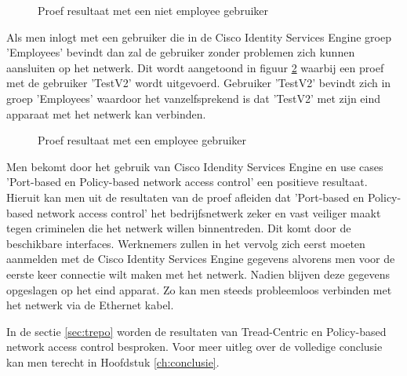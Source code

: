 \begin{figure}[H]
	\centering
	\qquad
	\newline
	\caption{Proef resultaat met een niet employee gebruiker}%
	\label{fig:Test_gebruiker}%
\end{figure}

Als men inlogt met een gebruiker die in de Cisco Identity Services Engine groep 'Employees' bevindt dan zal de gebruiker zonder problemen zich kunnen aansluiten op het netwerk. Dit wordt aangetoond in figuur \ref{fig:Test_gebruiker} waarbij een proef met de gebruiker 'TestV2' wordt uitgevoerd. Gebruiker 'TestV2' bevindt zich in groep 'Employees' waardoor het vanzelfsprekend is dat 'TestV2' met zijn eind apparaat met het netwerk kan verbinden. 

\begin{figure}[H]
	\centering
	\qquad
	\newline
	\qquad
	\caption{Proef resultaat met een employee gebruiker}%
	\label{fig:Test_gebruiker}%
\end{figure}

Men bekomt door het gebruik van Cisco Idendity Services Engine en use cases 'Port-based en Policy-based network access control' een positieve resultaat. Hieruit kan men uit de resultaten van de proef afleiden dat 'Port-based en Policy-based network access control' het bedrijfsnetwerk zeker en vast veiliger maakt tegen criminelen die het netwerk willen binnentreden. Dit komt door de beschikbare interfaces. Werknemers zullen in het vervolg zich eerst moeten aanmelden met de Cisco Identity Services Engine gegevens alvorens men voor de eerste keer connectie wilt maken met het netwerk. Nadien blijven deze gegevens opgeslagen op het eind apparat. Zo kan men steeds probleemloos verbinden met het netwerk via de Ethernet kabel.

In de sectie \ref{sec:trepo} worden de resultaten van Tread-Centric en Policy-based network access control besproken. Voor meer uitleg over de volledige conclusie kan men terecht in Hoofdstuk \ref{ch:conclusie}.


